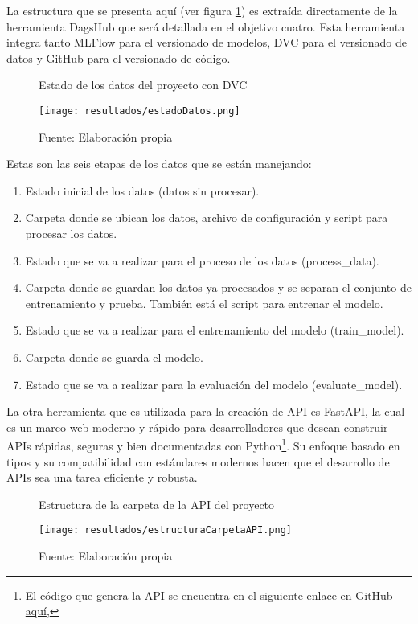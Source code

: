 La estructura que se presenta aquí (ver figura \ref{fig:figuraEstadoDatos}) es extraída directamente de la herramienta DagsHub que será detallada en el objetivo cuatro. Esta herramienta integra tanto MLFlow para el versionado de modelos, DVC para el versionado de datos y GitHub para el versionado de código.

\begin{figure}[h]
\centering
\caption{Estado de los datos del proyecto con DVC}
\texttt{[image: resultados/estadoDatos.png]}
\caption*{\footnotesize Fuente: Elaboración propia}
\label{fig:figuraEstadoDatos}
\end{figure}

\newpage

Estas son las seis etapas de los datos que se están manejando:

\begin{enumerate}
    \item Estado inicial de los datos (datos sin procesar).
    \item Carpeta donde se ubican los datos, archivo de configuración y script para procesar los datos.
    \item Estado que se va a realizar para el proceso de los datos (process\_data).
    \item Carpeta donde se guardan los datos ya procesados y se separan el conjunto de entrenamiento y prueba. También está el script para entrenar el modelo.
    \item Estado que se va a realizar para el entrenamiento del modelo (train\_model).
    \item Carpeta donde se guarda el modelo.
    \item Estado que se va a realizar para la evaluación del modelo (evaluate\_model).
\end{enumerate}

La otra herramienta que es utilizada para la creación de API es FastAPI, la cual es un marco web moderno y rápido para desarrolladores que desean construir APIs rápidas, seguras y bien documentadas con Python\footnote{El código que genera la API se encuentra en el siguiente enlace en GitHub \href{https://github.com/juferoto/mlops_project/tree/master/application/src}{aquí},}. Su enfoque basado en tipos y su compatibilidad con estándares modernos hacen que el desarrollo de APIs sea una tarea eficiente y robusta.

\newpage

\begin{figure}[h]
\centering
\caption{Estructura de la carpeta de la API del proyecto}
\texttt{[image: resultados/estructuraCarpetaAPI.png]}
\caption*{\footnotesize Fuente: Elaboración propia}
\label{fig:figuraEstructuraCarpetaAPI}
\end{figure}

